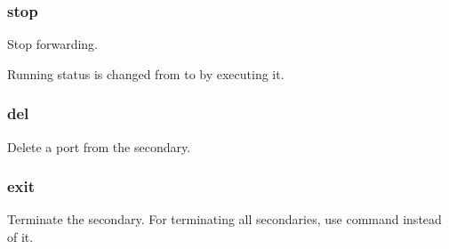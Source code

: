 \documentclass[a4paper,11pt,openany,oneside,english]{sphinxmanual}
\begin{document}
\subsubsection{stop}
\label{\detokenize{commands/secondary/spp_nfv:stop}}\label{\detokenize{commands/secondary/spp_nfv:commands-spp-nfv-stop}}
Stop forwarding.

\begin{sphinxVerbatim}[commandchars=\\\{\},formatcom=\footnotesize]
\end{sphinxVerbatim}

Running status is changed from  to  by
executing it.

\begin{sphinxVerbatim}[commandchars=\\\{\},formatcom=\footnotesize]
\end{sphinxVerbatim}


\subsubsection{del}
\label{\detokenize{commands/secondary/spp_nfv:del}}\label{\detokenize{commands/secondary/spp_nfv:commands-spp-nfv-del}}
Delete a port from the secondary.

\begin{sphinxVerbatim}[commandchars=\\\{\},formatcom=\footnotesize]
\end{sphinxVerbatim}


\subsubsection{exit}
\label{\detokenize{commands/secondary/spp_nfv:exit}}\label{\detokenize{commands/secondary/spp_nfv:commands-spp-nfv-exit}}
Terminate the secondary. For terminating all secondaries,
use  command instead of it.

\begin{sphinxVerbatim}[commandchars=\\\{\},formatcom=\footnotesize]
\end{sphinxVerbatim}
\end{document}
